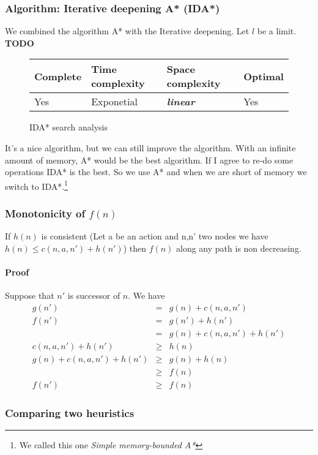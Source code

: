 \subsubsection{Algorithm: Iterative deepening A* (IDA*)}

We combined the algorithm A* with the Iterative deepening. Let $l$ be a limit. \textbf{TODO}

\begin{figure}[h]
\centering
\begin{tabular}{|llll|}
\hline
\textbf{Complete} & \textbf{Time complexity} & \textbf{Space complexity} & \textbf{Optimal} \\
\hline
Yes & Exponetial & \textbf{\textit{linear}} & Yes\\
\hline
\end{tabular}
\caption{IDA* search analysis}
\end{figure}

It's a nice algorithm, but we can still improve the algorithm. With an infinite amount of memory, A* would be the best algorithm. If I agree to re-do some operations IDA* is the best. So we use A* and when we are short of memory we switch to IDA*.\footnote{We called this one \textit{Simple memory-bounded A*}}

\subsubsection{Monotonicity of $f(n)$}

If $h(n)$ is consistent (Let a be an action and n,n' two nodes we have $h(n) \leq c(n,a,n') + h(n')$) then $f(n)$ along any path is non decreasing.

\paragraph{Proof}

Suppose that $n'$ is successor of $n$. We have
\begin{eqnarray*}
g(n') &=& g(n) + c(n,a,n')\\
f(n') &=& g(n') + h(n')\\
&=& g(n) + c(n,a,n') + h(n')\\
c(n,a,n') +h(n') &\geq& h(n)\\
g(n) + c(n,a,n') + h(n') &\geq& g(n) + h(n)\\
&\geq& f(n) \\
f(n') &\geq& f(n)
\end{eqnarray*}

\subsubsection{Comparing two heuristics}

